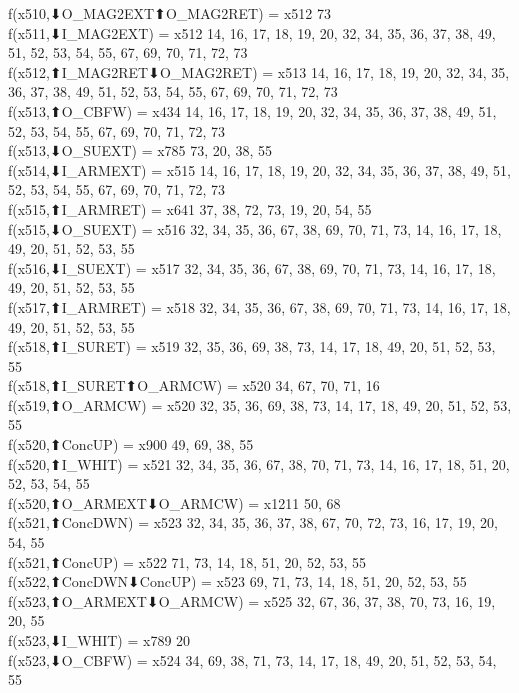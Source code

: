 f(x510,⬇O_MAG2EXT⬆O_MAG2RET) = x512 {73} \\
f(x511,⬇I_MAG2EXT) = x512 {14, 16, 17, 18, 19, 20, 32, 34, 35, 36, 37, 38, 49, 51, 52, 53, 54, 55, 67, 69, 70, 71, 72, 73} \\
f(x512,⬆I_MAG2RET⬇O_MAG2RET) = x513 {14, 16, 17, 18, 19, 20, 32, 34, 35, 36, 37, 38, 49, 51, 52, 53, 54, 55, 67, 69, 70, 71, 72, 73} \\
f(x513,⬆O_CBFW) = x434 {14, 16, 17, 18, 19, 20, 32, 34, 35, 36, 37, 38, 49, 51, 52, 53, 54, 55, 67, 69, 70, 71, 72, 73} \\
f(x513,⬇O_SUEXT) = x785 {73, 20, 38, 55} \\
f(x514,⬇I_ARMEXT) = x515 {14, 16, 17, 18, 19, 20, 32, 34, 35, 36, 37, 38, 49, 51, 52, 53, 54, 55, 67, 69, 70, 71, 72, 73} \\
f(x515,⬆I_ARMRET) = x641 {37, 38, 72, 73, 19, 20, 54, 55} \\
f(x515,⬇O_SUEXT) = x516 {32, 34, 35, 36, 67, 38, 69, 70, 71, 73, 14, 16, 17, 18, 49, 20, 51, 52, 53, 55} \\
f(x516,⬇I_SUEXT) = x517 {32, 34, 35, 36, 67, 38, 69, 70, 71, 73, 14, 16, 17, 18, 49, 20, 51, 52, 53, 55} \\
f(x517,⬆I_ARMRET) = x518 {32, 34, 35, 36, 67, 38, 69, 70, 71, 73, 14, 16, 17, 18, 49, 20, 51, 52, 53, 55} \\
f(x518,⬆I_SURET) = x519 {32, 35, 36, 69, 38, 73, 14, 17, 18, 49, 20, 51, 52, 53, 55} \\
f(x518,⬆I_SURET⬆O_ARMCW) = x520 {34, 67, 70, 71, 16} \\
f(x519,⬆O_ARMCW) = x520 {32, 35, 36, 69, 38, 73, 14, 17, 18, 49, 20, 51, 52, 53, 55} \\
f(x520,⬆ConcUP) = x900 {49, 69, 38, 55} \\
f(x520,⬆I_WHIT) = x521 {32, 34, 35, 36, 67, 38, 70, 71, 73, 14, 16, 17, 18, 51, 20, 52, 53, 54, 55} \\
f(x520,⬆O_ARMEXT⬇O_ARMCW) = x1211 {50, 68} \\
f(x521,⬆ConcDWN) = x523 {32, 34, 35, 36, 37, 38, 67, 70, 72, 73, 16, 17, 19, 20, 54, 55} \\
f(x521,⬆ConcUP) = x522 {71, 73, 14, 18, 51, 20, 52, 53, 55} \\
f(x522,⬆ConcDWN⬇ConcUP) = x523 {69, 71, 73, 14, 18, 51, 20, 52, 53, 55} \\
f(x523,⬆O_ARMEXT⬇O_ARMCW) = x525 {32, 67, 36, 37, 38, 70, 73, 16, 19, 20, 55} \\
f(x523,⬇I_WHIT) = x789 {20} \\
f(x523,⬇O_CBFW) = x524 {34, 69, 38, 71, 73, 14, 17, 18, 49, 20, 51, 52, 53, 54, 55} \\
